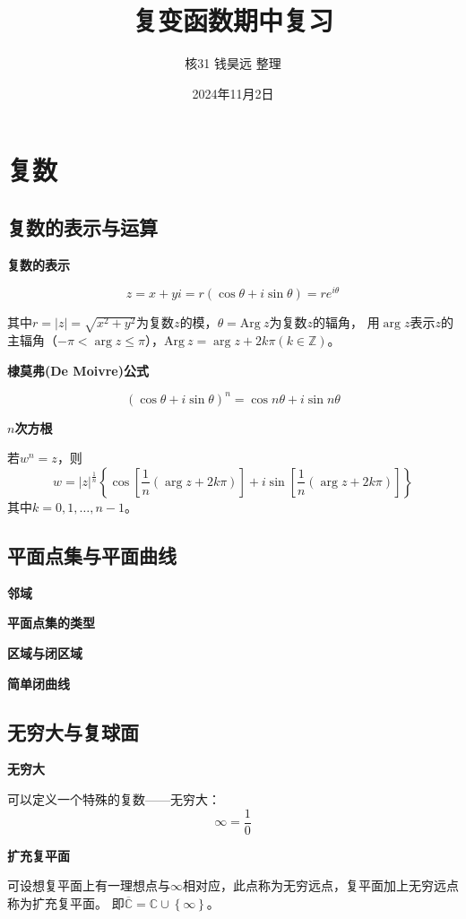 \documentclass[a4paper,12pt]{article}
\title{复变函数期中复习}
\author{核31\kern 36pt 钱昊远\kern 12pt 整理}
\date{2024年11月2日}
\begin{document}
\maketitle

\section{复数}

\subsection{复数的表示与运算}

\noindent
\textbf{复数的表示}

$$
z=x+yi=r(\cos\theta+i\sin\theta)=re^{i\theta}
$$

其中$r=\left|z\right|=\sqrt{x^2+y^2}$为复数$z$的模，$\theta=\text{Arg}\ z$为复数$z$的辐角，
用$\arg z$表示$z$的主辐角（$-\pi<\arg z\le\pi$），$\text{Arg}\ z=\arg z+2k\pi(k\in\mathbb Z)$。

\noindent
\textbf{棣莫弗(De Moivre)公式}

$$
(\cos\theta+i\sin\theta)^n=\cos n\theta+i\sin n\theta
$$

\noindent
\textbf{$n$次方根}

若$w^n=z$，则
$$
w=\left|z\right|^{\frac1n}\left\{\cos\left[\frac1n\left(\arg z+2k\pi\right)\right]
+i\sin\left[\frac1n\left(\arg z+2k\pi\right)\right]\right\}
$$
其中$k=0,1,\dots,n-1$。

\subsection{平面点集与平面曲线}

\noindent
\textbf{邻域}

\noindent
\textbf{平面点集的类型}

\noindent
\textbf{区域与闭区域}

\noindent
\textbf{简单闭曲线}

\subsection{无穷大与复球面}

\noindent
\textbf{无穷大}

可以定义一个特殊的复数——无穷大：
$$
\infty=\frac10
$$

\noindent
\textbf{扩充复平面}

可设想复平面上有一理想点与$\infty$相对应，此点称为无穷远点，复平面加上无穷远点称为扩充复平面。
即$\overline{\mathbb{C}}=\mathbb{C}\cup\left\{\infty\right\}$。
\end{document}
